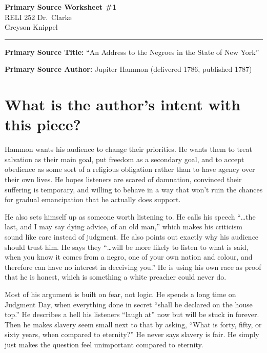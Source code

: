 \documentclass[12pt]{article}
\begin{document}
\begin{center}
	{\Large\bfseries Primary Source Worksheet \#1}\\[0.6em]
	RELI 252 \quad\textbullet\quad Dr.\ Clarke\\[0.3em]
	Greyson Knippel
\end{center}

\vspace{1em}
\hrule
\vspace{1.5em}

\noindent\textbf{Primary Source Title:} ``An Address to the Negroes in the State of New York''

\vspace{0.5em}

\noindent\textbf{Primary Source Author:} Jupiter Hammon (delivered 1786, published 1787)

\section*{What is the author's intent with this piece?}

Hammon wants his audience to change their priorities. He wants them to treat salvation as their main goal, put freedom as a secondary goal, and to accept obedience as some sort of a religious obligation rather than to have agency over their own lives. He hopes listeners are scared of damnation, convinced their suffering is temporary, and willing to behave in a way that won't ruin the chances for gradual emancipation that he actually does support.

He also sets himself up as someone worth listening to. He calls his speech ``\ldots the last, and I may say dying advice, of an old man,'' which makes his criticism sound like care instead of judgment. He also points out exactly why his audience should trust him. He says they ``\ldots will be more likely to listen to what is said, when you know it comes from a negro, one of your own nation and colour, and therefore can have no interest in deceiving you.'' He is using his own race as proof that he is honest, which is something a white preacher could never do.

Most of his argument is built on fear, not logic. He spends a long time on Judgment Day, when everything done in secret ``shall be declared on the house top.'' He describes a hell his listeners ``laugh at'' now but will be stuck in forever. Then he makes slavery seem small next to that by asking, ``What is forty, fifty, or sixty years, when compared to eternity?'' He never says slavery is fair. He simply just makes the question feel unimportant compared to eternity.
\end{document}
